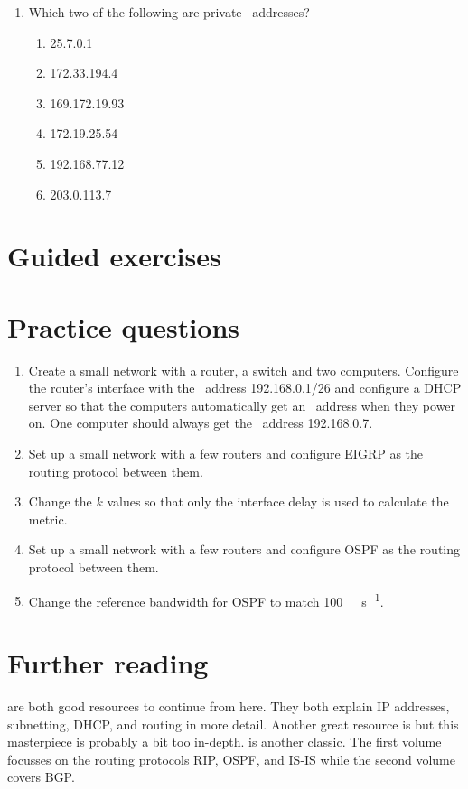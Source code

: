 \begin{enumerate}
\item
   Which two of the following are private \IP\ addresses?
   \begin{multicols}{2}
   \begin{enumerate}
   \item 25.7.0.1
   \item 172.33.194.4
   \item 169.172.19.93
   \item 172.19.25.54
   \item 192.168.77.12
   \item 203.0.113.7
   \end{enumerate}
\end{multicols}
\end{enumerate}

\section{Guided exercises}
\label{sec:ip-guided-exercises}

\section{Practice questions}
\label{sec:ip-practice-questions}
\begin{enumerate}
\item
   Create a small network with a router, a switch and two computers.
   Configure the router's interface with the \IP\ address 192.168.0.1/26 and configure a \acs{DHCP} server so that the computers automatically get an \IP\ address when they power on.
   One computer should always get the \IP\ address 192.168.0.7.
\item
   Set up a small network with a few routers and configure \acs{EIGRP} as the routing protocol between them.
\item
   Change the $k$ values so that only the interface delay is used to calculate the metric.
\item
   Set up a small network with a few routers and configure \acs{OSPF} as the routing protocol between them.
\item   
\label{ex:ip-ospf-ref-bw}
   Change the reference bandwidth for \acs{OSPF} to match \SI{100}{\giga\bit\per\second}.
\end{enumerate}



\section{Further reading}
\label{sec:ip-reading}
\textcite{lammle-ccna,lammle-comptia} are both good resources to continue from here.
They both explain \acs{IP} addresses, subnetting, \acs{DHCP}, and routing in more detail.
Another great resource is \textcite{stevens} but this masterpiece is probably a bit too in-depth.
\textcite{doyle} is another classic.
The first volume focusses on the routing protocols \acs{RIP}, \acs{OSPF}, and \acs{IS-IS} while the second volume covers \acs{BGP}.